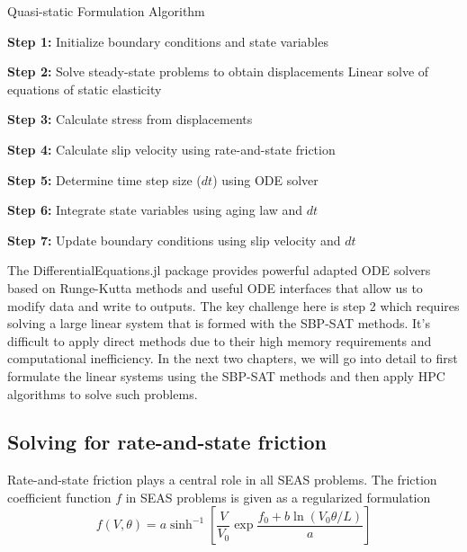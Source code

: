\begin{algorithm}
    \caption{Quasi-static Formulation Algorithm}
    \begin{algorithmic}[1]
        \State \textbf{Step 1:} Initialize boundary conditions and state variables
        
            \State \textbf{Step 2:} Solve steady-state problems to obtain displacements
            \State \hspace{1em} Linear solve of equations of static elasticity
            
            \State \textbf{Step 3:} Calculate stress from displacements
            
            \State \textbf{Step 4:} Calculate slip velocity using rate-and-state friction
            
            \State \textbf{Step 5:} Determine time step size ($dt$) using ODE solver
            
            \State \textbf{Step 6:} Integrate state variables using aging law and $dt$
            
            \State \textbf{Step 7:} Update boundary conditions using slip velocity and $dt$
        \EndWhile
    \end{algorithmic}
\end{algorithm}

The DifferentialEquations.jl package provides powerful adapted ODE solvers based on Runge-Kutta methods and useful ODE interfaces that allow us to modify data and write to outputs.
The key challenge here is step 2 which requires solving a large linear system that is formed with the SBP-SAT methods.
It's difficult to apply direct methods due to their high memory requirements and computational inefficiency. 
In the next two chapters, we will go into detail to first formulate the linear systems using the SBP-SAT methods and then apply HPC algorithms to solve such problems.


\subsection{Solving for rate-and-state friction}
Rate-and-state friction plays a central role in all SEAS problems. 
The friction coefficient function $f$ in SEAS problems is given as a regularized formulation
\begin{equation}
    f(V, \theta) = a \sinh^{-1} [\frac{V}{V_0} \exp{\frac{f_0 + b \ln(V_0 \theta / L)}{a}}]
    \label{eqn:friction-coefficient}
\end{equation}

